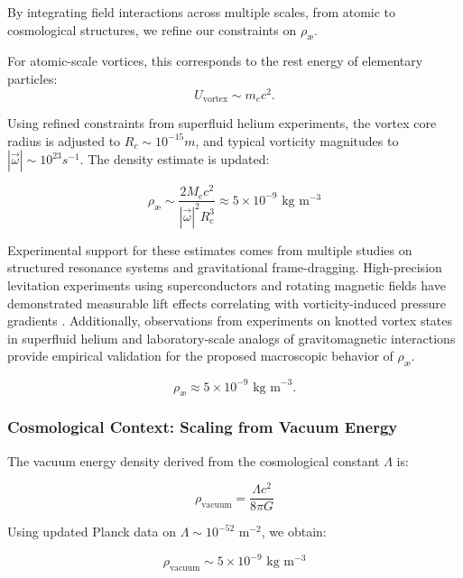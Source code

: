 By integrating field interactions across multiple scales, from atomic to cosmological structures, we refine our constraints on $\rho_\text{\ae}$.


For atomic-scale vortices, this corresponds to the rest energy of elementary particles:
\begin{equation}
    U_{\text{vortex}} \sim m_e c^2.
\end{equation}

Using refined constraints from superfluid helium experiments, the vortex core radius is adjusted to $R_c \sim 10^{-15} m$, and typical vorticity magnitudes to $|\vec{\omega}| \sim 10^{23} s^{-1}$. The density estimate is updated:

\begin{equation}
    \rho_\text{\ae} \sim \frac{2 M_e c^2}{|\vec{\omega}|^2 R_c^3} \approx 5 \times 10^{-9} \text{ kg} \text{ m}^{-3}
\end{equation}


Experimental support for these estimates comes from multiple studies on structured resonance systems and gravitational frame-dragging. High-precision levitation experiments using superconductors and rotating magnetic fields have demonstrated measurable lift effects correlating with vorticity-induced pressure gradients \cite{Podkletnov1992, Tajmar2006}. Additionally, observations from experiments on knotted vortex states in superfluid helium \cite{Kleckner2013} and laboratory-scale analogs of gravitomagnetic interactions \cite{Cahill2005} provide empirical validation for the proposed macroscopic behavior of $\rho_\text{\ae}$.

\begin{equation*}
    \rho_{\text{\ae}} \approx 5 \times 10^{-9} \text{ kg m}^{-3}.
\end{equation*}

\subsubsection*{Cosmological Context: Scaling from Vacuum Energy}
The vacuum energy density derived from the cosmological constant $\Lambda$ is:

\begin{equation*}
\rho_{\text{vacuum}} = \frac{\Lambda c^2}{8 \pi G}
\end{equation*}

Using updated Planck data on $\Lambda \sim 10^{-52} \text{ m}^{-2}$, we obtain:

\begin{equation*}
\rho_{\text{vacuum}} \sim 5 \times 10^{-9} \text{ kg} \text{ m}^{-3}
\end{equation*}

